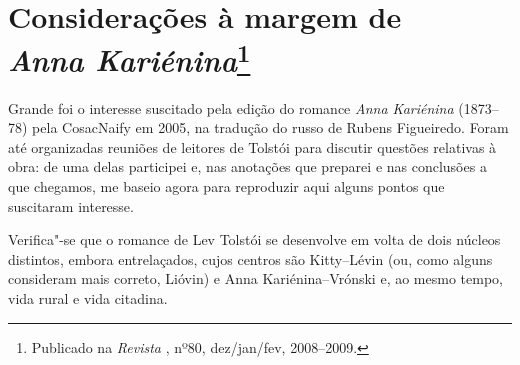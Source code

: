 \chapter{Considerações à margem de\\ \emph{Anna Kariénina}\footnote{Publicado na \emph{Revista \protect{}}, nº80, dez/jan/fev, 2008--2009.}}
\label{anna}

Grande foi o interesse suscitado pela edição do romance \emph{Anna
Kariénina} (1873--78) pela CosacNaify em 2005, na tradução do russo de Rubens Figueiredo. Foram até organizadas reuniões de leitores de Tolstói para discutir questões relativas à
obra: de uma delas participei e, nas anotações que preparei e nas
conclusões a que chegamos, me baseio agora para reproduzir aqui alguns
pontos que suscitaram interesse.

Verifica"-se que o romance de Lev Tolstói se desenvolve em
volta de dois núcleos distintos, embora entrelaçados, cujos centros
são Kitty--Lévin (ou, como alguns consideram mais correto, Lióvin) e Anna Kariénina--Vrónski e, ao mesmo tempo, vida
rural e vida citadina.

